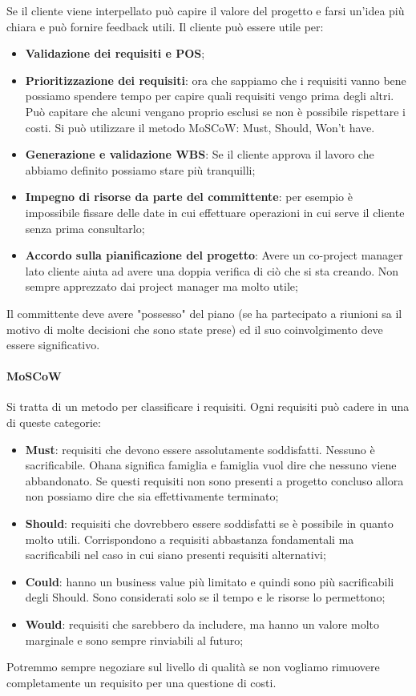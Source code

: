 \noindent Se il cliente viene interpellato può capire il valore del progetto e farsi un'idea più chiara e può fornire feedback utili.
Il cliente può essere utile per:
\begin{itemize}
	\item \textbf{Validazione dei requisiti e POS};
	\item \textbf{Prioritizzazione dei requisiti}: ora che sappiamo che i requisiti vanno bene possiamo spendere tempo per capire quali requisiti vengo prima degli altri. Può capitare che alcuni vengano proprio esclusi se non è possibile rispettare i costi. Si può utilizzare il metodo MoSCoW: Must, Should, Won't have.
	\item \textbf{Generazione e validazione WBS}: Se il cliente approva il lavoro che abbiamo definito possiamo stare più tranquilli;
	\item \textbf{Impegno di risorse da parte del committente}: per esempio è impossibile fissare delle date in cui effettuare operazioni in cui serve il cliente senza prima consultarlo;
	\item \textbf{Accordo sulla pianificazione del progetto}: Avere un co-project manager lato cliente aiuta ad avere una doppia verifica di ciò che si sta creando. Non sempre apprezzato dai project manager ma molto utile;
\end{itemize}
Il committente deve avere "possesso" del piano (se ha partecipato a riunioni sa il motivo di molte decisioni che sono state prese) ed il suo coinvolgimento deve essere significativo.

\paragraph{MoSCoW}
Si tratta di un metodo per classificare i requisiti. Ogni requisiti può cadere in una di queste categorie:
\begin{itemize}
	\item \textbf{Must}: requisiti che devono essere assolutamente soddisfatti. Nessuno è sacrificabile. Ohana significa famiglia e famiglia vuol dire che nessuno viene abbandonato. Se questi requisiti non sono presenti a progetto concluso allora non possiamo dire che sia effettivamente terminato;
	\item \textbf{Should}: requisiti che dovrebbero essere soddisfatti se è possibile in quanto molto utili. Corrispondono a requisiti abbastanza fondamentali ma sacrificabili nel caso in cui siano presenti requisiti alternativi;
	\item \textbf{Could}: hanno un business value più limitato e quindi sono più sacrificabili degli Should. Sono considerati solo se il tempo e le risorse lo permettono;
	\item \textbf{Would}: requisiti che sarebbero da includere, ma hanno un valore molto marginale e sono sempre rinviabili al futuro;
\end{itemize}
\begin{warn}
	Potremmo sempre negoziare sul livello di qualità se non vogliamo rimuovere completamente un requisito per una questione di costi.
\end{warn}
